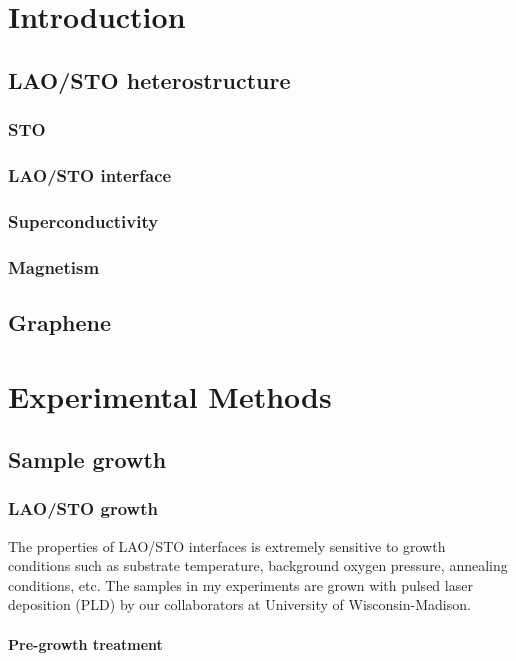 \documentclass[pdflatex, sectionletters, 12pt]{pittetd}    %
\begin{document}
\chapter{Introduction}%

\section{LAO/STO heterostructure}

\subsection{STO}

\subsection{LAO/STO interface}

\subsection{Superconductivity}

\subsection{Magnetism}

\section{Graphene}


\chapter{Experimental Methods}

\section{Sample growth}

\subsection{LAO/STO growth}
The properties of LAO/STO interfaces is extremely sensitive to growth conditions such as substrate temperature, background oxygen pressure, annealing conditions, etc\cite{}. The samples in my experiments are grown with pulsed laser deposition (PLD) by our collaborators at University of Wisconsin-Madison.

\subsubsection{Pre-growth treatment}
\end{document}
